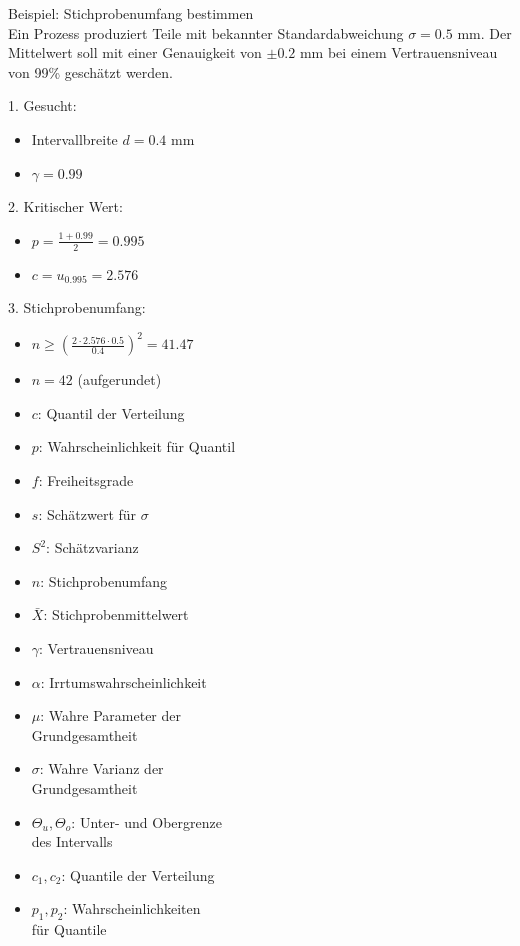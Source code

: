 \begin{example2}{Beispiel: Stichprobenumfang bestimmen}\\
Ein Prozess produziert Teile mit bekannter Standardabweichung $\sigma = 0.5$ mm. Der Mittelwert soll mit einer Genauigkeit von $\pm 0.2$ mm bei einem Vertrauensniveau von 99\% geschätzt werden.

1. Gesucht:
   \begin{itemize}
     \item Intervallbreite $d = 0.4$ mm
     \item $\gamma = 0.99$
   \end{itemize}

2. Kritischer Wert:
   \begin{itemize}
     \item $p = \frac{1+0.99}{2} = 0.995$
     \item $c = u_{0.995} = 2.576$
   \end{itemize}

3. Stichprobenumfang:
   \begin{itemize}
     \item $n \geq (\frac{2 \cdot 2.576 \cdot 0.5}{0.4})^2 = 41.47$
     \item $n = 42$ (aufgerundet)
   \end{itemize}
\end{example2}

\begin{remark}
\begin{minipage}[t]{0.5\textwidth}
\begin{itemize}
  \item $c$: Quantil der Verteilung
  \item $p$: Wahrscheinlichkeit für Quantil
  \item $f$: Freiheitsgrade
  \item $s$: Schätzwert für $\sigma$
  \item $S^2$: Schätzvarianz
  \item $n$: Stichprobenumfang
  \item $\bar{X}$: Stichprobenmittelwert
  \item $\gamma$: Vertrauensniveau
  \item $\alpha$: Irrtumswahrscheinlichkeit
\end{itemize}
\end{minipage}
\begin{minipage}[t]{0.5\textwidth}
\begin{itemize}
  \item $\mu$: Wahre Parameter der \\Grundgesamtheit
  \item $\sigma$: Wahre Varianz der \\Grundgesamtheit
  \item $\Theta_u, \Theta_o$: Unter- und Obergrenze \\des Intervalls
  \item $c_1, c_2$: Quantile der Verteilung
  \item $p_1, p_2$: Wahrscheinlichkeiten \\für Quantile
\end{itemize}
\end{minipage}
\end{remark}

